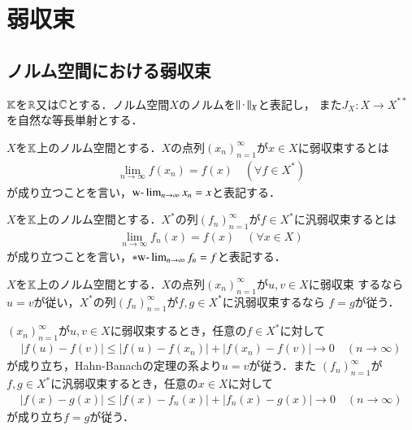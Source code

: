 \chapter{弱収束}
\section{ノルム空間における弱収束}

	$\mathbb{K}$を$\mathbb{R}$又は$\mathbb{C}$とする．ノルム空間$X$のノルムを$\left\|\, \cdot\, \right\|_{X}$と表記し，
	また$J_X: X \rightarrow X^{**}$を自然な等長単射とする．
	\begin{screen}
		\begin{dfn}[弱収束]
			$X$を$\mathbb{K}$上のノルム空間とする．$X$の点列$(x_n)_{n=1}^{\infty}$が$x \in X$に弱収束するとは
			\begin{align}
				\lim_{n \to \infty} f(x_n) = f(x) \quad (\forall f \in X^*)
			\end{align}
			が成り立つことを言い，$\mbox{w-}\lim_{n \to \infty} x_n = x$と表記する．
		\end{dfn}
	\end{screen}
	
	\begin{screen}
		\begin{dfn}[汎弱収束]
			$X$を$\mathbb{K}$上のノルム空間とする．$X^*$の列$(f_n)_{n=1}^{\infty}$が$f \in X^*$に汎弱収束するとは
			\begin{align}
				\lim_{n \to \infty} f_n(x) = f(x) \quad (\forall x \in X)
			\end{align}
			が成り立つことを言い，$\ast \mbox{w-}\lim_{n \to \infty} f_n = f$と表記する．
		\end{dfn}
	\end{screen}
	
	\begin{screen}
		\begin{thm}[弱収束及び汎弱収束極限の一意性]
			$X$を$\mathbb{K}$上のノルム空間とする．$X$の点列$(x_n)_{n=1}^{\infty}$が$u,v \in X$に弱収束
			するなら$u = v$が従い，$X^*$の列$(f_n)_{n=1}^{\infty}$が$f,g \in X^*$に汎弱収束するなら
			$f = g$が従う．
		\end{thm}
	\end{screen}
	
	\begin{prf}
		$(x_n)_{n=1}^{\infty}$が$u,v \in X$に弱収束するとき，任意の$f \in X^*$に対して
		\begin{align}
			\left| f(u) - f(v) \right| \leq \left| f(u) - f(x_n) \right| + \left| f(x_n) - f(v) \right| \longrightarrow 0 
			\quad (n \longrightarrow \infty)
		\end{align}
		が成り立ち，Hahn-Banachの定理の系より$u = v$が従う．また
		$(f_n)_{n=1}^{\infty}$が$f,g \in X^*$に汎弱収束するとき，任意の$x \in X$に対して
		\begin{align}
			\left| f(x) - g(x) \right| \leq \left| f(x) - f_n(x) \right| + \left| f_n(x) - g(x) \right| \longrightarrow 0 
			\quad (n \longrightarrow \infty)
		\end{align}
		が成り立ち$f = g$が従う．
		\QED
	\end{prf}
	
